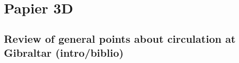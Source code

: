 



\section{Papier 3D}
\subsection{Review of general points about circulation at Gibraltar (intro/biblio)}

